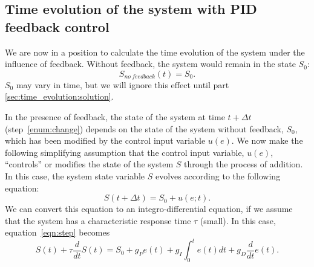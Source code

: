 \documentclass{article}
\begin{document}
\subsection{Time evolution of the system with PID feedback control}
We are now in a position to calculate the time evolution of the system under the influence of feedback. Without feedback, the system would remain in the state $S_0$:	
\begin{equation}
S_{no~feedback}(t) = S_0.
\end{equation}
$S_0$ may vary in time, but we will ignore this effect until part \ref{sec:time_evolution:solution}.

In the presence of feedback, the state of the system at time $t + \Delta t$ (step~\ref{enum:change}) depends on the state of the system without feedback, $S_0$, which has been modified by the control input variable $u(e)$. We now make the following simplifying assumption that the control input variable, $u(e)$, ``controls'' or modifies the state of the system $S$ through the process of addition. In this case, the system state variable $S$ evolves according to the following equation:
\begin{equation}
S(t+\Delta t) = S_0 + u(e;t). \label{eqn:step}
\end{equation}
We can convert this equation to an integro-differential equation, if we assume that the system has a characteristic response time $\tau$ (small).  In this case, equation~\ref{eqn:step} becomes
\begin{equation}
S(t) + \tau \frac{d}{dt} S(t) = S_0 + g_P e(t) + g_I \int_0^t e(t)dt + g_D \frac{d}{dt} e(t). \label{eqn:full_diff_eq}
\end{equation}
\end{document}
